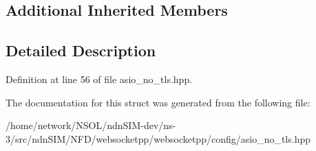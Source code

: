 \subsection*{Additional Inherited Members}


\subsection{Detailed Description}


Definition at line 56 of file asio\+\_\+no\+\_\+tls.\+hpp.



The documentation for this struct was generated from the following file\+:\begin{DoxyCompactItemize}
\item 
/home/network/\+N\+S\+O\+L/ndn\+S\+I\+M-\/dev/ns-\/3/src/ndn\+S\+I\+M/\+N\+F\+D/websocketpp/websocketpp/config/asio\+\_\+no\+\_\+tls.\+hpp\end{DoxyCompactItemize}
